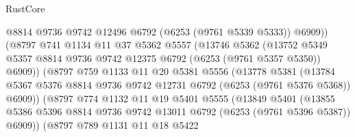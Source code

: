 \begin{lexlean}{RustCore}
\begin{coremodule}
                            @8814
                            @9736
                            @9742
                            @12496
                            @6792
                            (@6253 (@9761 @5339 @5333))
                            @6909))
                        (@8797
                          @741
                          @1134
                          @11
                          @37
                          @5362
                          @5557
                          (@13746
                            @5362
                            (@13752
                              @5349
                              @5357
                              @8814
                              @9736
                              @9742
                              @12375
                              @6792
                              (@6253 (@9761 @5357 @5350))
                              @6909))
                          (@8797
                            @759
                            @1133
                            @11
                            @20
                            @5381
                            @5556
                            (@13778
                              @5381
                              (@13784
                                @5367
                                @5376
                                @8814
                                @9736
                                @9742
                                @12731
                                @6792
                                (@6253 (@9761 @5376 @5368))
                                @6909))
                            (@8797
                              @774
                              @1132
                              @11
                              @19
                              @5401
                              @5555
                              (@13849
                                @5401
                                (@13855
                                  @5386
                                  @5396
                                  @8814
                                  @9736
                                  @9742
                                  @13011
                                  @6792
                                  (@6253 (@9761 @5396 @5387))
                                  @6909))
                              (@8797
                                @789
                                @1131
                                @11
                                @18
                                @5422

\end{coremodule}
\end{lexlean}
